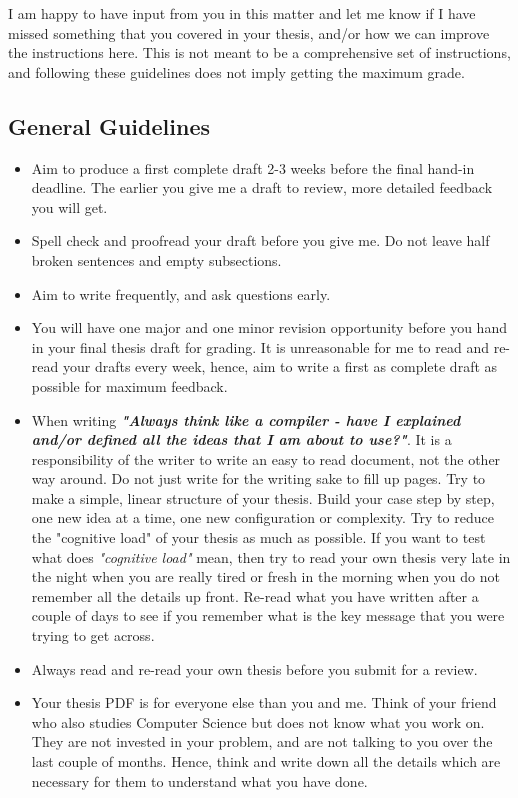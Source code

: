 \documentclass[11pt]{article}
\begin{document}
I am happy to have input from you in this matter and let me know if I have missed something that you covered in your thesis, and/or how we can improve the instructions here. This is not meant to be a comprehensive set of instructions, and following these guidelines does not imply getting the maximum grade. 

\subsection*{General Guidelines}
\begin{itemize}
    \item Aim to produce a first complete draft 2-3 weeks before the final hand-in deadline. The earlier you give me a draft to review, more detailed feedback you will get. 
    \item Spell check and proofread your draft before you give me. Do not leave half broken sentences and empty subsections.
    \item Aim to write frequently, and ask questions early. 
    \item You will have one major and one minor revision opportunity before you hand in your final thesis draft for grading. It is unreasonable for me to read and re-read your drafts every week, hence, aim to write a first as complete draft as possible for maximum feedback. 
    \item When writing \textbf{\textit{"Always think like a compiler - have I explained and/or defined all the ideas that I am about to use?"}}. It is a responsibility of the writer to write an easy to read document, not the other way around. Do not just write for the writing sake to fill up pages. Try to make a simple, linear structure of your thesis. Build your case step by step, one new idea at a time, one new configuration or complexity. Try to reduce the "cognitive load" of your thesis as much as possible. If you want to test what does \textit{"cognitive load"} mean, then try to read your own thesis very late in the night when you are really tired or fresh in the morning when you do not remember all the details up front. Re-read what you have written after a couple of days to see if you remember what is the key message that you were trying to get across. 
    \item Always read and re-read your own thesis before you submit for a review. 
    \item Your thesis PDF is for everyone else than you and me. Think of your friend who also studies Computer Science but does not know what you work on. They are not invested in your problem, and are not talking to you over the last couple of months. Hence, think and write down all the details which are necessary for them to understand what you have done. 
\end{itemize}
\end{document}
